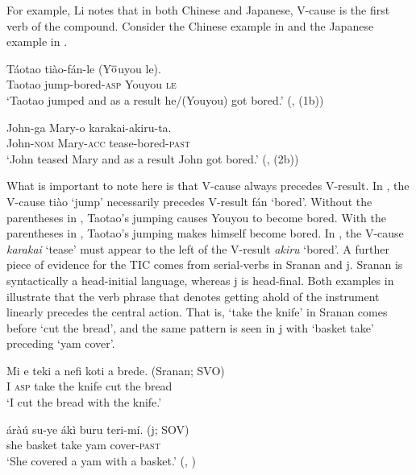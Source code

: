 \documentclass[output=paper]{LSP/langsci}
\begin{document}
For example, Li notes that in both Chinese and Japanese, V-cause is the first verb of the compound. Consider the Chinese example in  and the Japanese example in .

 \begin{exe}
 
 \ex \gll T\'{a}otao ti\`{a}o-f\'{a}n-le (Y$\overline{\rm{o}}$uyou le).\\
 Taotao jump-bored-\textsc{asp} Youyou \textsc{le}\\
 \glt `Taotao jumped and as a result he/(Youyou) got bored.' (\citealt[480]{Li1993}, (1b))
 
 \ex \gll John-ga Mary-o karakai-akiru-ta.\\
 John-\textsc{nom} Mary-\textsc{acc} tease-bored-\textsc{past}\\
 \glt `John teased Mary and as a result John got bored.'  (\citealt[481]{Li1993}, (2b))
 
 \end{exe}

What is important to note here is that V-cause always precedes V-result. In , the V-cause ti\`ao `jump' necessarily precedes V-result f\'an `bored'. Without the parentheses in , Taotao's jumping causes Youyou to become bored. With the parentheses in , Taotao's jumping makes himself become bored. In , the V-cause \textit{karakai} `tease' must appear to the left of the V-result \textit{akiru} `bored'. A further piece of evidence for the TIC comes from serial-verbs in Sranan and j. Sranan is syntactically a head-initial language, whereas j is head-final. Both examples in  illustrate that the verb phrase that denotes getting ahold of the instrument linearly precedes the central action. That is, `take the knife' in Sranan comes before `cut the bread', and the same pattern is seen in j with `basket take' preceding `yam cover'.

\begin{exe}
\ex
\begin{xlist}

\ex \gll Mi e teki a nefi koti a brede. \hspace{2cm} (Sranan; SVO)\\
I \textsc{asp} take the knife cut the bread \\
\glt `I cut the bread with the knife.'

\ex \gll \'{a}r\`{a}\'{u} su-ye \'{a}k\`{i} buru teri-m\'{i}. \hspace{2.6cm} (j; SOV)\\
she basket take yam cover-\textsc{past}\\
\glt `She covered a yam with a basket.' (\citealt[500]{Li1993}, )

\end{xlist}
\end{exe}
\end{document}
